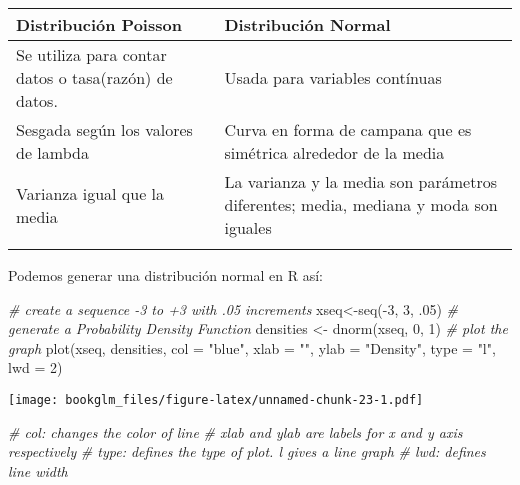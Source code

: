 \documentclass[
]{book}
\newenvironment{Shaded}{\begin{snugshade}}{\end{snugshade}}
\newcommand{\AttributeTok}[1]{\textcolor[rgb]{0.77,0.63,0.00}{#1}}
\newcommand{\CommentTok}[1]{\textcolor[rgb]{0.56,0.35,0.01}{\textit{#1}}}
\newcommand{\DecValTok}[1]{\textcolor[rgb]{0.00,0.00,0.81}{#1}}
\newcommand{\FunctionTok}[1]{\textcolor[rgb]{0.00,0.00,0.00}{#1}}
\newcommand{\NormalTok}[1]{#1}
\newcommand{\OtherTok}[1]{\textcolor[rgb]{0.56,0.35,0.01}{#1}}
\newcommand{\SpecialCharTok}[1]{\textcolor[rgb]{0.00,0.00,0.00}{#1}}
\newcommand{\StringTok}[1]{\textcolor[rgb]{0.31,0.60,0.02}{#1}}
\begin{document}
\begin{longtable}[]{@{}
  >{\raggedright\arraybackslash}p{}
  >{\raggedright\arraybackslash}p{}@{}}
\toprule
Distribución Poisson & Distribución Normal \\
\midrule
\endhead
Se utiliza para contar datos o tasa(razón) de datos. & Usada para variables contínuas \\
Sesgada según los valores de lambda & Curva en forma de campana que es simétrica alrededor de la media \\
Varianza igual que la media & La varianza y la media son parámetros diferentes; media, mediana y moda son iguales \\
& \\
\bottomrule
\end{longtable}

Podemos generar una distribución normal en R así:

\begin{Shaded}
\begin{Highlighting}[]
\CommentTok{\# create a sequence {-}3 to +3 with .05 increments}
\NormalTok{xseq}\OtherTok{\textless{}{-}}\FunctionTok{seq}\NormalTok{(}\SpecialCharTok{{-}}\DecValTok{3}\NormalTok{, }\DecValTok{3}\NormalTok{, .}\DecValTok{05}\NormalTok{) }
\CommentTok{\# generate a Probability Density Function}
\NormalTok{densities }\OtherTok{\textless{}{-}} \FunctionTok{dnorm}\NormalTok{(xseq, }\DecValTok{0}\NormalTok{, }\DecValTok{1}\NormalTok{)}
\CommentTok{\# plot the graph}
\FunctionTok{plot}\NormalTok{(xseq, densities, }\AttributeTok{col =} \StringTok{"blue"}\NormalTok{, }\AttributeTok{xlab =} \StringTok{""}\NormalTok{, }\AttributeTok{ylab =} \StringTok{"Density"}\NormalTok{, }\AttributeTok{type =} \StringTok{"l"}\NormalTok{, }\AttributeTok{lwd =} \DecValTok{2}\NormalTok{)}
\end{Highlighting}
\end{Shaded}

\texttt{[image: bookglm\_files/figure-latex/unnamed-chunk-23-1.pdf]}

\begin{Shaded}
\begin{Highlighting}[]
\CommentTok{\# col: changes the color of line}
\CommentTok{\# \textquotesingle{}xlab\textquotesingle{} and \textquotesingle{}ylab\textquotesingle{} are labels for x and y axis respectively}
\CommentTok{\# type: defines the type of plot. \textquotesingle{}l\textquotesingle{} gives a line graph}
\CommentTok{\# lwd: defines line width}
\end{Highlighting}
\end{Shaded}
\end{document}
